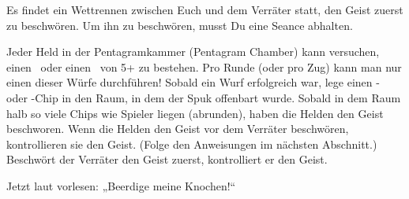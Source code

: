





Es findet ein Wettrennen zwischen Euch und dem Verräter statt, den Geist zuerst zu beschwören. Um ihn zu beschwören, musst Du eine Seance abhalten.
  \begin{itemize}
        \bitem Jeder Held in der Pentagramkammer (Pentagram Chamber) kann versuchen, einen \knowroll\ oder einen \sanityroll\ von 5+ zu bestehen. Pro Runde (oder pro Zug) kann man nur einen dieser Würfe durchführen!
        \bitem Sobald ein Wurf erfolgreich war, lege einen \know- oder \sanity-Chip in den Raum, in dem der Spuk offenbart wurde. Sobald in dem Raum halb so viele Chips wie Spieler liegen (abrunden), haben die Helden den Geist beschworen.
        \bitem Wenn die Helden den Geist vor dem Verräter beschwören, kontrollieren sie den Geist. (Folge den Anweisungen im nächsten Abschnitt.) Beschwört der Verräter den Geist zuerst, kontrolliert er den Geist.
    \end{itemize}
\newpage
{}

    Jetzt laut vorlesen: „Beerdige meine Knochen!“

